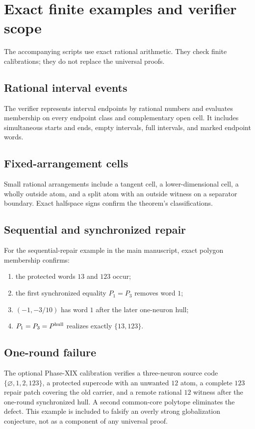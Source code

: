 \section{Exact finite examples and verifier scope}
\label{app:exact-examples}

The accompanying scripts use exact rational arithmetic.  They check finite calibrations; they do not replace the universal proofs.

\subsection{Rational interval events}
The verifier represents interval endpoints by rational numbers and evaluates membership on every endpoint class and complementary open cell.  It includes simultaneous starts and ends, empty intervals, full intervals, and marked endpoint words.

\subsection{Fixed-arrangement cells}
Small rational arrangements include a tangent cell, a lower-dimensional cell, a wholly outside atom, and a split atom with an outside witness on a separator boundary.  Exact halfspace signs confirm the theorem's classifications.

\subsection{Sequential and synchronized repair}
For the sequential-repair example in the main manuscript, exact polygon membership confirms:
\begin{enumerate}
\item the protected words $13$ and $123$ occur;
\item the first synchronized equality $P_1=P_3$ removes word $1$;
\item $(-1,-3/10)$ has word $1$ after the later one-neuron hull;
\item $P_1=P_3=P^{\rm hull}$ realizes exactly $\{13,123\}$.
\end{enumerate}

\subsection{One-round failure}
The optional Phase-XIX calibration verifies a three-neuron source code $\{\varnothing,1,2,123\}$, a protected supercode with an unwanted $12$ atom, a complete $123$ repair patch covering the old carrier, and a remote rational $12$ witness after the one-round synchronized hull.  A second common-core polytope eliminates the defect.  This example is included to falsify an overly strong globalization conjecture, not as a component of any universal proof.

